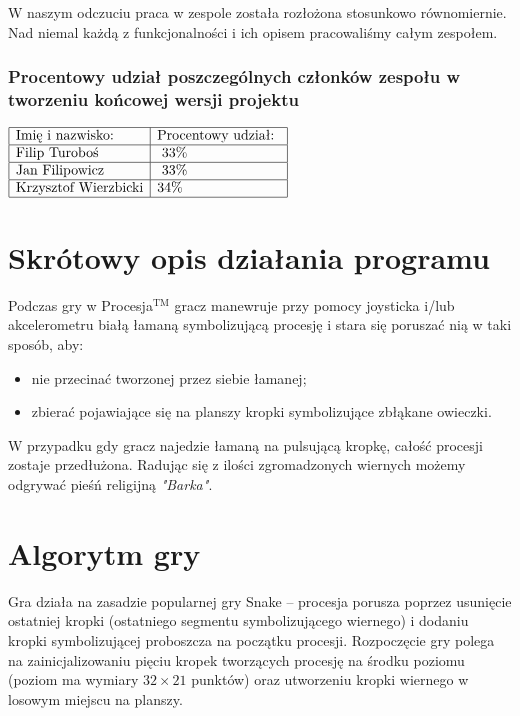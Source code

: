 \documentclass[a4paper,12pt,twoside]{article}
\theoremstyle{plain}
\theoremstyle{definition}
\theoremstyle{remark}
\begin{document}
W naszym odczuciu praca w zespole została rozłożona stosunkowo równomiernie. Nad niemal każdą z funkcjonalności i ich opisem pracowaliśmy całym zespołem.

\subsubsection{Procentowy udział poszczególnych członków zespołu w tworzeniu końcowej wersji projektu}
$\begin{array}{|l|l|l|}
\hline
\textrm{Imię i nazwisko: }& \textrm{Procentowy udział: }\\
\hline
 \textrm{Filip Turoboś}&\textrm{ 33\%}\\
\hline
\textrm{Jan Filipowicz}&\textrm{	33\% 	}\\
\hline
\textrm{Krzysztof Wierzbicki}& \textrm{34\%}\\
\hline
\end{array}$
\newpage
\section{Skrótowy opis działania programu}
Podczas gry w Procesja$^{\textrm{TM}}$ gracz manewruje przy pomocy joysticka i/lub akcelerometru białą łamaną symbolizującą procesję i stara się poruszać nią w taki sposób, aby:
\begin{itemize}
	\item nie przecinać tworzonej przez siebie łamanej; 
	\item zbierać pojawiające się na planszy kropki symbolizujące zbłąkane owieczki.
\end{itemize}

W przypadku gdy gracz najedzie łamaną na pulsującą kropkę, całość procesji zostaje przedłużona. Radując się z ilości zgromadzonych wiernych możemy odgrywać pieśń religijną \textit{"Barka"}.

\section{Algorytm gry}
Gra działa na zasadzie popularnej gry Snake -- procesja porusza poprzez usunięcie ostatniej kropki (ostatniego segmentu symbolizującego wiernego) i dodaniu kropki symbolizującej proboszcza na początku procesji. Rozpoczęcie gry polega na zainicjalizowaniu pięciu kropek tworzących procesję na środku poziomu (poziom ma wymiary $32 \times 21$ punktów) oraz utworzeniu kropki wiernego w losowym miejscu na planszy.
\end{document}
